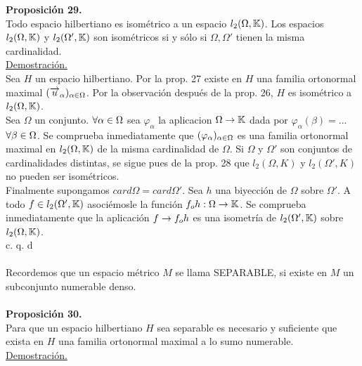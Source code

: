  \textbf{Proposición 29.} \\
 Todo espacio hilbertiano es isométrico a un espacio $l_2(\Omega, \mathbb{K})$. Los espacios $l_2 (\Omega,\mathbb{K})$ y $l_2 (\Omega',\mathbb{K})$ son isométricos si y sólo si $\Omega, \Omega'$ tienen la misma cardinalidad. \\
 \underline{Demostración.}\\
 Sea $H$ un espacio hilbertiano. Por la prop. 27 existe en $H$ una familia ortonormal maximal $(\overrightarrow{u}_\alpha)_{\alpha \in \Omega}$. Por la observación después de la prop. 26, $H$ es isométrico a $l_2(\Omega,\mathbb{K})$. \\
 Sea $\Omega$ un conjunto. $\forall \alpha \in \Omega$ sea $\varphi_\alpha$ la aplicacion $\Omega \rightarrow \mathbb{K}$ dada por $\varphi_\alpha (\beta)=...$ $\forall \beta \in \Omega$. Se comprueba inmediatamente que $(\varphi_\alpha)_{\alpha \in \Omega}$ es una familia ortonormal maximal en $l_2 (\Omega, \mathbb{K})$ de la misma cardinalidad de $\Omega$. Si  $\Omega$ y $\Omega'$ son conjuntos de cardinalidades distintas, se sigue pues de la prop. 28 que $l_2 (\Omega, K)$ y $l_2 (\Omega ',K)$ no pueden ser isométricos.\\
 Finalmente supongamos $card \Omega=card \Omega '$. Sea $h$ una biyección de $\Omega$ sobre $\Omega '$. A todo $f \in l_2(\Omega ',\mathbb{K})$ asociémosle la función $f_o h: \Omega \rightarrow \mathbb{K}$. Se comprueba inmediatamente que la aplicación $f \rightarrow f_o h$ es una isometría de $l_2 (\Omega ',\mathbb{K})$ sobre $l_2 (\Omega,\mathbb{K})$. \\
  \phantom{sssssssssssssssssssssssssssssssssss sasdasdasdasdadadssada} c. q. d \\ \\
 Recordemos que un espacio métrico $M$ se llama SEPARABLE, si existe en $M$ un subconjunto numerable denso.  \\ \\
 \textbf{Proposición 30.} \\
 Para que un espacio hilbertiano $H$ sea separable es necesario y suficiente que exista en $H$ una familia ortonormal maximal a lo sumo numerable. \\
 \underline{Demostración.}  \\
 
